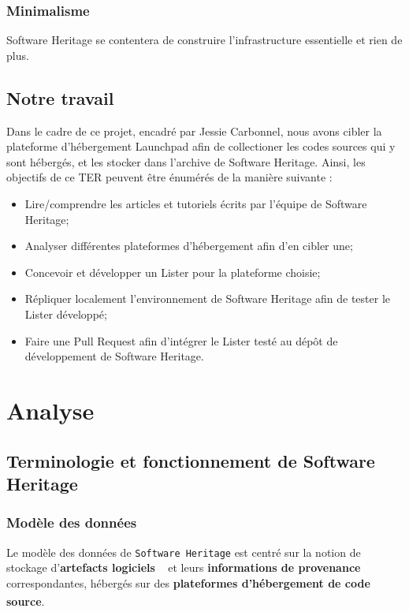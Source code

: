 \documentclass[12pt,a4paper]{report}
\theoremstyle{definition}
\begin{document}
\subsection{Minimalisme}
Software Heritage se contentera de construire l'infrastructure essentielle et rien de plus.
\section{Notre travail}
Dans le cadre de ce projet, encadré par Jessie Carbonnel, nous avons cibler la plateforme d'hébergement Launchpad afin de collectioner les codes sources qui y sont hébergés, et les stocker dans l'archive de Software Heritage. Ainsi, les objectifs de ce TER peuvent être énumérés de la manière suivante :
\begin{itemize}
\item Lire/comprendre les articles et tutoriels écrits par l'équipe de Software Heritage;
\item Analyser différentes plateformes d'hébergement afin d'en cibler une;
\item Concevoir et développer un Lister pour la plateforme choisie;
\item Répliquer localement l'environnement de Software Heritage afin de tester le Lister développé;
\item Faire une Pull Request afin d'intégrer le Lister testé au dépôt de développement de Software Heritage.
\end{itemize}

\chapter{Analyse}
\section{Terminologie et fonctionnement de Software Heritage}
\subsection{Modèle des données}
Le modèle des données de \texttt{Software Heritage} est centré sur la notion de stockage d'\og \textbf{artefacts logiciels} \fg~ et leurs \textbf{informations de provenance} correspondantes, hébergés sur des \textbf{plateformes d'hébergement de code source}\textsuperscript{\citep{dicosmoWhyAndHow}}.
\end{document}
